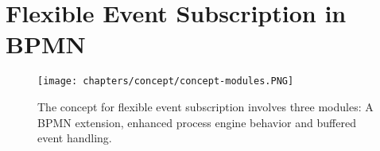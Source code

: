 \chapter{Flexible Event Subscription in BPMN}\label{ch:flexibleeventsubscription}


\begin{figure}[]
	\myfloatalign
	{\texttt{[image: chapters/concept/concept-modules.PNG]}}
	\caption{The concept for flexible event subscription involves three modules: A BPMN extension, enhanced process engine behavior and buffered event handling.}\label{fig:concept-modules}
\end{figure}




